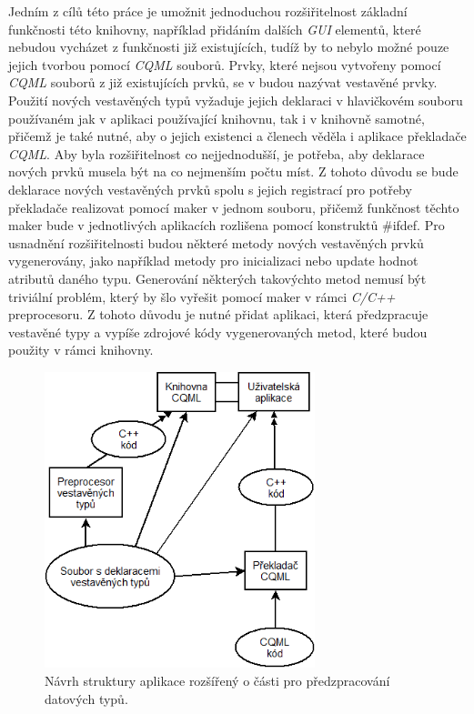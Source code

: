 \documentclass[11pt,twoside,a4paper]{book}
\begin{document}
{{\begin{ttemize}
{{Jedním z cílů této práce je umožnit jednoduchou rozšiřitelnost základní funkčnosti této knihovny, například přidáním dalších \textit{GUI} elementů, které nebudou vycházet z funkčnosti již existujících, tudíž by to nebylo možné pouze jejich tvorbou pomocí \textit{CQML} souborů. Prvky, které nejsou vytvořeny pomocí \textit{CQML} souborů z již existujících prvků, se v budou nazývat vestavěné prvky.
Použití nových vestavěných typů vyžaduje jejich deklaraci v hlavičkovém souboru používaném jak v aplikaci používající knihovnu, tak i v knihovně samotné, přičemž je také nutné, aby o jejich existenci a členech věděla i aplikace překladače \textit{CQML}. Aby byla rozšiřitelnost co nejjednodušší, je potřeba, aby deklarace nových prvků musela být na co nejmenším počtu míst. Z tohoto důvodu se bude deklarace nových vestavěných prvků spolu s jejich registrací pro potřeby překladače realizovat pomocí maker v jednom souboru, přičemž funkčnost těchto maker bude v jednotlivých aplikacích rozlišena pomocí konstruktů \#ifdef.
Pro usnadnění rozšiřitelnosti budou některé metody nových vestavěných prvků vygenerovány, jako například metody pro inicializaci nebo update hodnot atributů daného typu. Generování některých takovýchto metod nemusí být triviální problém, který by šlo vyřešit pomocí maker v rámci \textit{C/C++} preprocesoru. Z tohoto důvodu je nutné přidat aplikaci, která předzpracuje vestavěné typy a vypíše zdrojové kódy vygenerovaných metod, které budou použity v rámci knihovny.

\begin{figure}[!ht]
\begin{center}
  \includegraphics[width=0.7\textwidth]{Diagram2}
\caption{{\label{fig:structure2}}Návrh struktury aplikace rozšířený o části pro předzpracování datových typů.}
\end{center}
\end{figure}

}}
\end{ttemize}}}
\end{document}
